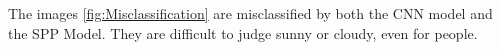 The images \ref{fig:Misclassification} are misclassified by both the CNN model and the SPP Model. They are difficult to judge sunny or cloudy, even for people.
\graphicspath{ {./Figures/} }
\begin{figure}[htb]
    \centering
\end{figure}
